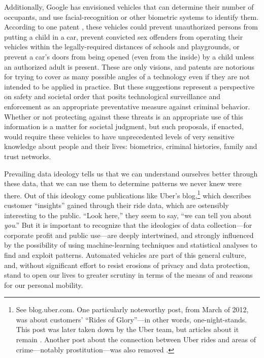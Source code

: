 Additionally, Google has envisioned vehicles that can determine their number of
occupants, and use facial-recognition or other biometric systems to
identify them. According to one patent \cite{predictPatent}, these vehicles could prevent
unauthorized persons from putting a child in a car, prevent convicted
sex offenders from operating their vehicles within the
legally-required distances of schools and playgrounds, or prevent a
car's doors from being opened (even from the inside) by a child unless
an authorized adult is present. These are only visions, and patents
are notorious for trying to cover as many possible angles of a
technology even if they are not intended to be applied in practice.
But these suggestions represent a perspective on safety and societal
order that posits technological surveillance and enforcement as an
appropriate preventative measure against criminal behavior. Whether or not protecting
against these threats is an appropriate use of this information is a
matter for societal judgment, but such proposals, if enacted, would
require these vehicles to have unprecedented levels of very sensitive
knowledge about people and their lives: biometrics, criminal
histories, family and trust networks. 

Prevailing data ideology tells us that we can understand ourselves better through
these data, that we can use them to determine patterns we never knew were
there. Out of this ideology come publications like Uber's
blog,\footnote{See blog.uber.com. One particularly noteworthy post,
  from March of 2012, was about customers' ``Rides of Glory''---in
  other words, one-night-stands. This post was later taken down by the
Uber team, but articles about it remain \cite{gigaomHarris}. Another
post about the connection between Uber rides and areas of
crime---notably prostitution---was also removed \cite{venturebeatObrien}.} which
describes customer ``insights'' gained through their ride data, which
are ostensibly interesting to the public. ``Look here,'' they seem to
say, ``we can tell you about \emph{you}.'' But it is important to
recognize that the ideologies of data collection---for corporate
profit and public use---are deeply intertwined, and strongly
influenced by the possibility of using machine-learning techniques and
statistical analyses to find and exploit patterns. Automated vehicles
are part of this general culture, and, without significant effort to
resist erosions of privacy and data protection, stand to open our lives
to greater scrutiny in terms of the means of and reasons for our
personal mobility.


